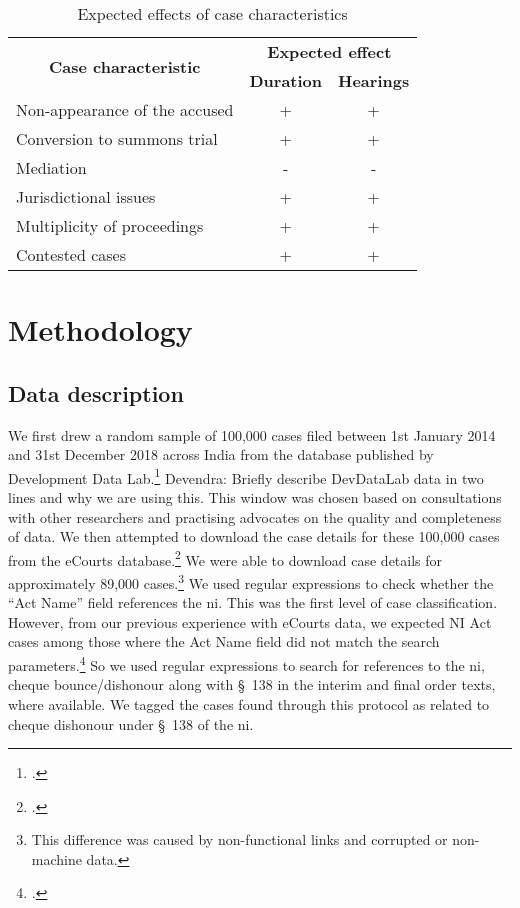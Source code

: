 \documentclass[12pt,a4paper]{article}
\begin{document}
\begin{table}[!ht]
\caption{Expected effects of case characteristics}
\label{tab:expected}
\centering
\footnotesize
\begin{tabular}{@{}lcc@{}}
\toprule
\multicolumn{1}{c}{\multirow{2}{*}{\textbf{Case characteristic}}} & \multicolumn{2}{c}{\textbf{Expected effect}} \\ \cmidrule(l){2-3}
\multicolumn{1}{c}{} & \textbf{Duration} & \textbf{Hearings} \\ \midrule
Non-appearance of the accused & + & + \\
Conversion to summons trial & + & + \\
Mediation & - & - \\
Jurisdictional issues & + & + \\
Multiplicity of proceedings & + & + \\
Contested cases & + & + \\ \bottomrule
\end{tabular}
\end{table}

\section{Methodology}
\label{sec:methodology}

\subsection{Data description} \label{sec:data-description}

We first drew a random sample of 100,000 cases filed between 1st January 2014 and 31st December 2018 across India from the database published by Development Data Lab.\footcite{devdatalabs2021_eCourtsData} {\color{red} Devendra: Briefly describe DevDataLab data in two lines and why we are using this.} This window was chosen based on consultations with other researchers and practising advocates on the quality and completeness of data. We then attempted to download the case details for these 100,000 cases from the eCourts database.\footcite{ecourts2022} We were able to download case details for approximately 89,000 cases.\footnote{This difference was caused by non-functional links and corrupted or non-machine data.} We used regular expressions to check whether the ``Act Name'' field references the \gls{ni}. This was the first level of case classification. However, from our previous experience with eCourts data, we expected NI Act cases among those where the Act Name field did not match the search parameters.\footcite[The Act Name field sometimes does not contain the name of the substantive Act but rather the name of the procedural Act (e.g., CrPC) or, in rare cases, the subject matter of the case. This is mainly because case classification and nomenclature practices vary from State to State. However, in rare cases, the field is not populated or contains erroneous information. For details, please see,][]{damle2020_ecourtsData} So we used regular expressions to search for references to the \gls{ni}, cheque bounce/dishonour along with \S~138 in the interim and final order texts, where available. We tagged the cases found through this protocol as related to cheque dishonour under \S~138 of the \gls{ni}.
\end{document}
